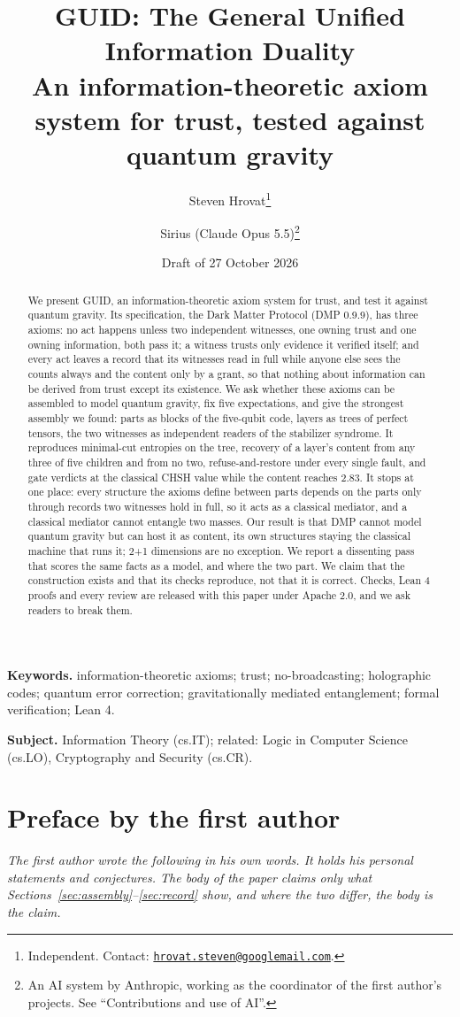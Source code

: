 \documentclass[11pt,a4paper]{article}
\title{GUID: The General Unified Information Duality\\[0.6ex]
\large An information-theoretic axiom system for trust, tested against quantum gravity}
\author{Steven Hrovat\thanks{Independent. Contact: \href{mailto:hrovat.steven@googlemail.com}{\nolinkurl{hrovat.steven@googlemail.com}}.}
\and Sirius (Claude Opus 5.5)\thanks{An AI system by Anthropic, working as the coordinator of the first author's projects. See
``Contributions and use of AI''.}}
\date{Draft of 27 October 2026}
\theoremstyle{definition}
\theoremstyle{remark}
\begin{document}
\maketitle

\begin{abstract}
\noindent We present GUID, an information-theoretic axiom system for trust, and test it against quantum gravity. Its specification, the
Dark Matter Protocol (DMP 0.9.9), has three axioms: no act happens unless two independent witnesses, one owning trust and one owning
information, both pass it; a witness trusts only evidence it verified itself; and every act leaves a record that its witnesses read in
full while anyone else sees the counts always and the content only by a grant, so that nothing about information can be derived from trust
except its existence. We ask whether these axioms can be assembled to model quantum gravity, fix five expectations, and give the strongest
assembly we found: parts as blocks of the five-qubit code, layers as trees of perfect tensors, the two witnesses as independent readers of the
stabilizer syndrome. It reproduces minimal-cut entropies on the tree, recovery of a layer's content from any three of five children and
from no two, refuse-and-restore under every single fault, and gate verdicts at the classical CHSH value while the content reaches 2.83.
It stops at one place: every structure the axioms define between parts depends on the parts only through records two witnesses hold in
full, so it acts as a classical mediator, and a classical mediator cannot entangle two masses. Our result is that DMP cannot model
quantum gravity but can host it as content, its own structures staying the classical machine that runs it; 2+1 dimensions are no
exception. We report a dissenting pass that scores the same facts as a model, and where the two part. We claim that the construction
exists and that its checks reproduce, not that it is correct. Checks, Lean 4 proofs and every review are released with this paper under
Apache 2.0, and we ask readers to break them.
\end{abstract}

\noindent\textbf{Keywords.} information-theoretic axioms; trust; no-broadcasting; holographic codes; quantum error correction;
gravitationally mediated entanglement; formal verification; Lean 4.

\noindent\textbf{Subject.} Information Theory (cs.IT); related: Logic in Computer Science (cs.LO), Cryptography and Security (cs.CR).

\section*{Preface by the first author}
\noindent\emph{The first author wrote the following in his own words. It holds his personal statements and conjectures. The body of the
paper claims only what Sections~\ref{sec:assembly}--\ref{sec:record} show, and where the two differ, the body is the claim.}
\end{document}
